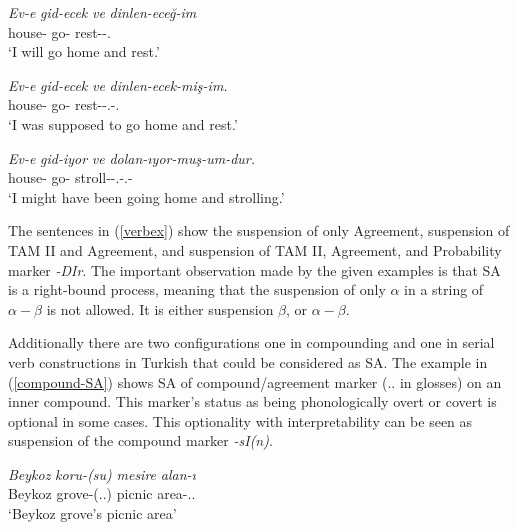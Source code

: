 \begin{exe}
    \ex \label{verbex}
    \begin{xlist}
        \ex 
        \gll 
        \textit{Ev-e} \textit{gid-ecek} \textit{ve} \textit{dinlen-eceğ-im} \\ house-{\Dat} go-{\Fut} {\And} rest-{\Fut}-{\First}.{\Sg} \\
        \glt `I will go home and rest.'
        
        \ex 
        \gll 
        \textit{Ev-e} \textit{gid-ecek} \textit{ve} \textit{dinlen-ecek-miş-im.} \\ house-{\Dat} go-{\Fut} {\And} rest-{\Fut}-{\Cop}.{\Evi}-{\First}.{\Sg} \\
        \glt  `I was supposed to go home and rest.'
        
        \ex 
        \gll 
        \textit{Ev-e} \textit{gid-iyor} \textit{ve} \textit{dolan-ıyor-muş-um-dur.} \\ house-{\Dat} go-{\Fut} {\And} stroll-{\Prog}-{\Cop}.{\Evi}-{\First}.{\Sg}-{\Prob} \\
        \glt `I might have been going home and strolling.'
    \end{xlist}
\end{exe}
The sentences in (\ref{verbex}) show the suspension of only Agreement, suspension of TAM II and Agreement, and suspension of TAM II, Agreement, and Probability marker \textit{-DIr}. The important observation made by the given examples is that SA is a right-bound process, meaning that the suspension of only $\alpha$ in a string of $\alpha-\beta$ is not allowed. It is either suspension $\beta$, or $\alpha-\beta$.

Additionally there are two configurations one in compounding and one in serial verb constructions in Turkish that could be considered as SA. The example in (\ref{compound-SA}) shows SA of compound/agreement marker ({\Poss}.{\Third}.{\Sg} in glosses) on an inner compound. This marker's status as being phonologically overt or covert is optional in some cases. This optionality with interpretability can be seen as suspension of the compound marker \textit{-sI(n)}.

\begin{exe}
    \ex \label{compound-SA}
    \gll
    \textit{Beykoz} \textit{koru-(su)} \textit{mesire} \textit{alan-ı} \\ Beykoz grove-({\Poss}.{\Third}.{\Sg}) picnic area-{\Poss}.{\Third}.{\Sg} \\
    \glt `Beykoz grove's picnic area'
 \end{exe}
 
